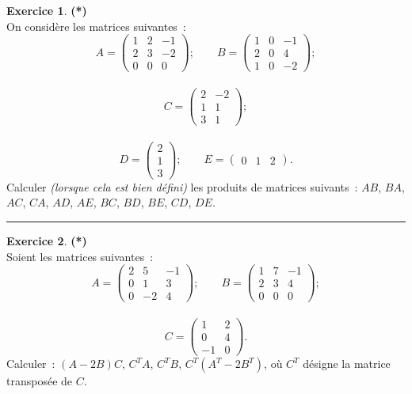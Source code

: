 \documentclass[a4paper,11pt]{article}
\theoremstyle{definition}
\newtheorem{exo}{Exercice} %
\begin{document}
\begin{minipage}{1\linewidth}
	\begin{minipage}[t]{0.48\linewidth}
		\raggedright
	
\begin{exo}\textbf{(*)}\quad\\[0.2cm]
	On consid\`ere les matrices suivantes~:
	$$
	A = \left(\begin{array}{ccc}1& 2 & -1\\ 2 & 3 & -2\\ 0 &0 & 0\end{array}\right); \quad\quad B = \left(\begin{array}{ccc}1 & 0 & -1\\ 2 & 0 & 4\\ 1 & 0 & -2\end{array}\right); $$ \hfill\\[-0.5cm]$$  C = \left(\begin{array}{cc} 2 &-2 \\ 1 & 1\\ 3 & 1\end{array}\right);$$\hfill\\[-0.5cm]
	$$D = \left(\begin{array}{c} 2 \\ 1 \\ 3\end{array}\right);\quad\quad E = \left(\begin{array}{ccc}0 & 1 & 2 \end{array}\right).
	$$
	Calculer \textit{(lorsque cela est bien d\'efini)} les produits de matrices suivants~: $AB$, $BA$, $AC$, $CA$, $AD$, $AE$, $BC$, $BD$, $BE$, $CD$, $DE$.
	
	\centering
	\rule{1\linewidth}{0.6pt}
\end{exo}



\begin{exo}\textbf{(*)}\quad\\[0.2cm]
 	Soient les matrices suivantes~:
 	$$
 	A = \left(\begin{array}{ccc}2& 5 & -1\\ 0 & 1 & 3\\ 0 &-2 & 4\end{array}\right); \quad\quad B = \left(\begin{array}{ccc}1 & 7 & -1\\ 2 & 3 & 4\\ 0 & 0 & 0\end{array}\right); $$\hfill\\[-0.5cm] $$  C = \left(\begin{array}{cc} 1 & 2 \\ 0 & 4\\ -1 & 0\end{array}\right).
 	$$
 	Calculer~:
 	$(A - 2 B)C$,
 	$C^{T}A$,
 	$C^T B$,
 	$C^{T}(A^T - 2 B^T)$,
 	o\`u $C^T$ d\'esigne la matrice transpos\'ee de $C$.
 	

\end{exo}
\end{minipage}
\end{minipage}
\end{document}
